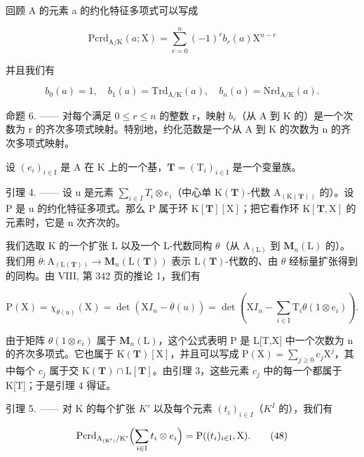 回顾 A 的元素 a 的约化特征多项式可以写成

\[
\mathrm{Pcrd} _ {\mathrm{A/K}} (a; \mathrm{X}) = \sum_ {r = 0} ^ {n} (- 1) ^ {r} b _ {r} (a) \mathrm{X} ^ {n - r}\tag{46}
\]

并且我们有

\[
b _ {0} (a) = 1, \quad b _ {1} (a) = \mathrm{Trd} _ {\mathrm{A/K}} (a), \quad b _ {n} (a) = \mathrm{Nrd} _ {\mathrm{A/K}} (a).
\]

命题 6. —— 对每个满足 \(0 \leqslant r \leqslant n\) 的整数 r，映射 \(b_{r}\)（从 A 到 K 的）是一个次数为 r 的齐次多项式映射。特别地，约化范数是一个从 A 到 K 的次数为 n 的齐次多项式映射。

设 \((e_{i})_{i\in\mathrm{I}}\) 是 A 在 K 上的一个基，\(\mathbf{T}=(\mathrm{T}_{i})_{i\in\mathrm{I}}\) 是一个变量族。

引理 4. —— 设 u 是元素 \(\sum_{i\in I}T_{i}\otimes e_{i}\)（中心单 \(\mathrm{K}(\mathbf{T})\)-代数 \(\mathrm{A}_{(\mathrm{K}(\mathbf{T}))}\) 的）。设 P 是 u 的约化特征多项式。那么 P 属于环 \(\mathrm{K}[\mathbf{T}][\mathrm{X}]\)；把它看作环 \(\mathrm{K}[\mathbf{T},\mathrm{X}]\) 的元素时，它是 n 次齐次的。

我们选取 K 的一个扩张 L 以及一个 L-代数同构 \(\theta\)（从 \(\mathrm{A}_{(\mathrm{L})}\) 到 \(\mathbf{M}_{n}(\mathrm{L})\) 的）。我们用 \(\overline{\theta}: \mathrm{A}_{(\mathrm{L}(\mathbf{T}))} \to \mathbf{M}_{n}(\mathrm{L}(\mathbf{T}))\) 表示 \(\mathrm{L}(\mathbf{T})\)-代数的、由 \(\theta\) 经标量扩张得到的同构。由 VIII, 第 342 页的推论 1，我们有

\[
\mathrm{P} (\mathrm{X}) = \chi_ {\overline {{\theta}} (u)} (\mathrm{X}) = \det (\mathrm{X} I _ {n} - \overline {{\theta}} (u)) = \det \left(\mathrm{X} I _ {n} - \sum_ {i \in \mathrm{I}} \mathrm{T} _ {i} \theta (1 \otimes e _ {i})\right).\tag{47}
\]

由于矩阵 \(\theta(1\otimes e_{i})\) 属于 \(\mathbf{M}_{n}(\mathrm{L})\)，这个公式表明 P 是 L{[}T,X{]} 中一个次数为 n 的齐次多项式。它也属于 \(\mathrm{K}(\mathbf{T})[\mathrm{X}]\)，并且可以写成 \(\mathrm{P}(\mathrm{X})=\sum_{j\geqslant0}c_{j}\mathrm{X}^{j}\)，其中每个 \(c_{j}\) 属于交 \(\mathrm{K}(\mathbf{T})\cap\mathrm{L}[\mathbf{T}]\)。由引理 3，这些元素 \(c_{j}\) 中的每一个都属于 K{[}T{]}；于是引理 4 得证。

引理 5. —— 对 K 的每个扩张 \(K'\) 以及每个元素 \((t_{i})_{i\in I}\)（\(K^{I}\) 的），我们有

\[
\mathrm{Pcrd} _ {\mathrm{A} _ {(\mathrm{K} ^ {\prime})} / \mathrm{K} ^ {\prime}} \Bigl (\sum_ {i \in \mathrm{I}} t _ {i} \otimes e _ {i} \Bigr) = \mathrm{P} ((t _ {i}) _ {i \in \mathrm{I}}, \mathrm{X}).\tag{48}
\]

